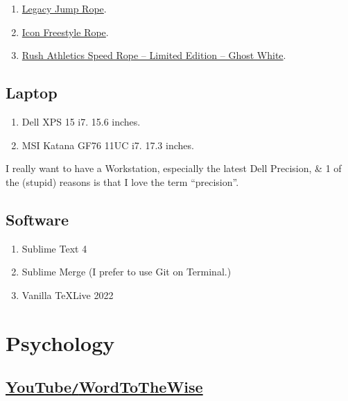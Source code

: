 \documentclass{article}
\begin{document}
\begin{enumerate}
	\item \href{https://www.rushathletics.co.uk/collections/ropes/products/legacy-jump-rope}{Legacy Jump Rope}.
	\item \href{https://www.rushathletics.co.uk/collections/ropes/products/icon-freestyle-rope}{Icon Freestyle Rope}.
	\item \href{https://www.rushathletics.co.uk/collections/ropes/products/rush-athletics-speed-rope-ghost-white}{Rush Athletics Speed Rope -- Limited Edition -- Ghost White}.
\end{enumerate}

\subsection{Laptop}

\begin{enumerate}
	\item {\sc Dell XPS 15 i7.} 15.6 inches.
	\item {\sc MSI Katana GF76 11UC i7.} 17.3 inches.
\end{enumerate}
I really want to have a Workstation, especially the latest {\sc Dell Precision}, \& 1 of the (stupid) reasons is that I love the term ``precision''.

\subsection{Software}

\begin{enumerate}
	\item Sublime Text 4
	\item Sublime Merge (I prefer to use Git on Terminal.)
	\item Vanilla \TeX Live 2022
\end{enumerate}



\section{Psychology}

\subsection{\href{https://www.youtube.com/channel/UCLb_x8TboHIoO0F7uYSl4Ww}{YouTube{\tt/}WordToTheWise}}
\end{document}
